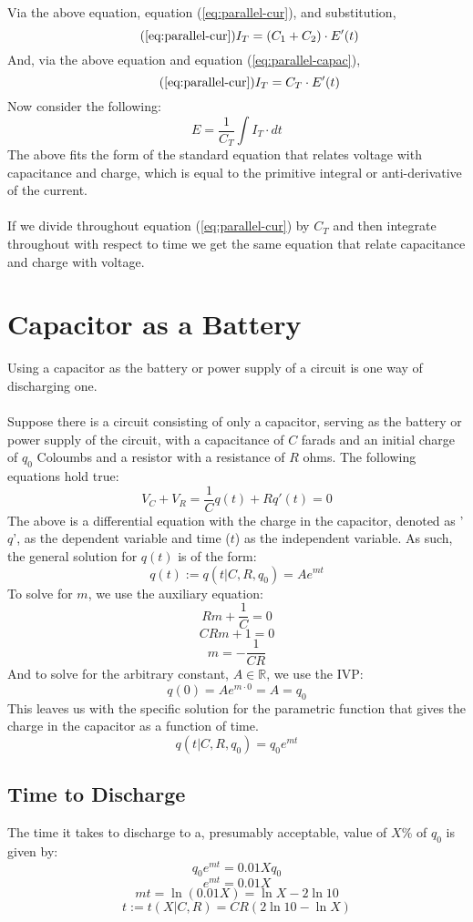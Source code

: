 \documentclass{article}
\begin{document}
	Via the above equation, equation (\ref{eq:parallel-cur}), and substitution,
	\begin{equation}\tag{\ref{eq:parallel-cur}}
		I_T = (C_1  + C_2) \cdot E'(t)
	\end{equation}
	And, via the above equation and equation (\ref{eq:parallel-capac}),
	\begin{equation}\tag{\ref{eq:parallel-cur}}
		I_T = C_T \cdot E'(t)
	\end{equation}
	Now consider the following:
	$$ E = \frac{1}{C_T} \int I_T \cdot dt$$
	The above fits the form of the standard equation that relates voltage with 
	capacitance and charge, which is equal to the primitive integral or 
	anti-derivative of the current. \\ \\
	If we divide throughout equation (\ref{eq:parallel-cur}) by $C_T$ and then 
	integrate throughout with respect to time we get the same equation that 
	relate capacitance and charge with voltage.
	\section[Discharge]{Capacitor as a Battery}
	Using a capacitor as the battery or power supply of a circuit is one way of 
	discharging one.  \\ \\
	Suppose there is a circuit consisting of only a capacitor, serving as the 
	battery or power supply of the circuit, with a capacitance of $C$ 
	farads and an initial charge of $q_0$ Coloumbs and a resistor with a 
	resistance of $R$ ohms.  The following equations hold true:
	$$ V_C + V_R = \frac{1}{C}q(t) + Rq'(t) = 0$$
	The above is a differential equation with the charge in the capacitor, 
	denoted as '$q$', as the dependent variable and time ($t$) as the 
	independent variable.  As such, the general solution for $q(t)$ is of the 
	form:
	$$ q(t) := q(t \vert C, R, q_0) = Ae^{mt}$$
	To solve for $m$, we use the auxiliary equation:
	$$ Rm + \frac{1}{C} = 0$$
	$$ CRm + 1 = 0$$
	$$ m = - \frac{1}{CR}$$
	And to solve for the arbitrary constant, $A \in \mathbb{R}$, we use the IVP:
	$$ q(0) = Ae^{m \cdot 0} = A = q_0$$
	This leaves us with the specific solution for the parametric function that 
	gives the charge in the capacitor as a function of time.
	$$ q(t \vert C, R, q_0) = q_0e^{mt}$$
	\subsection[Duration]{Time to Discharge}
	The time it takes to discharge to a, presumably acceptable, value of 
	$X\text{\%}$ of $q_0$ is given by:
	$$ q_0e^{mt} = 0.01Xq_0$$
	$$ e^{mt} = 0.01X$$
	$$ mt = \ln(0.01X) = \ln X - 2\ln 10$$
	$$ t := t(X \vert C, R) = CR(2\ln 10 - \ln X)$$
\end{document}
